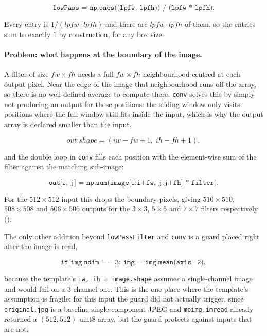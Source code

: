 \begin{equation}
\label{eq:hw3-lowpassfilter}
\texttt{lowPass = np.ones((lpfw, lpfh)) / (lpfw * lpfh)}.
\end{equation}

Every entry is $1/(\mathit{lpfw}\cdot\mathit{lpfh})$ and there are
$\mathit{lpfw}\cdot\mathit{lpfh}$ of them, so the entries sum to exactly $1$
by construction, for any box size.

\paragraph{Problem: what happens at the boundary of the image.} A filter of
size $\mathit{fw}\times\mathit{fh}$ needs a full $\mathit{fw}\times\mathit{fh}$
neighbourhood centred at each output pixel. Near the edge of the image that
neighbourhood runs off the array, so there is no well-defined average to
compute there. \texttt{conv} solves this by simply not producing an output for
those positions: the sliding window only visits positions where the full
window still fits inside the input, which is why the output array is declared
smaller than the input,

\begin{equation}
\label{eq:hw3-outshape}
\mathit{out.shape} = (\mathit{iw} - \mathit{fw} + 1,\; \mathit{ih} - \mathit{fh} + 1),
\end{equation}

and the double loop in \texttt{conv} fills each position with the element-wise
sum of the filter against the matching sub-image:

\begin{equation}
\label{eq:hw3-convloop}
\texttt{out[i, j] = np.sum(image[i:i+fw, j:j+fh] * filter)}.
\end{equation}

For the $512\times512$ input this drops the boundary pixels, giving
$510\times510$, $508\times508$ and $506\times506$ outputs for the $3\times3$,
$5\times5$ and $7\times7$ filters respectively ().

The only other addition beyond \texttt{lowPassFilter} and \texttt{conv} is a
guard placed right after the image is read,

\begin{equation}
\label{eq:hw3-guard}
\texttt{if img.ndim == 3: img = img.mean(axis=2)},
\end{equation}

because the template's \texttt{iw, ih = image.shape} assumes a single-channel
image and would fail on a 3-channel one. This is the one place where the
template's assumption is fragile: for this input the guard did not actually
trigger, since \texttt{original.jpg} is a baseline single-component JPEG and
\texttt{mpimg.imread} already returned a $(512, 512)$ uint8 array, but the
guard protects against inputs that are not.

